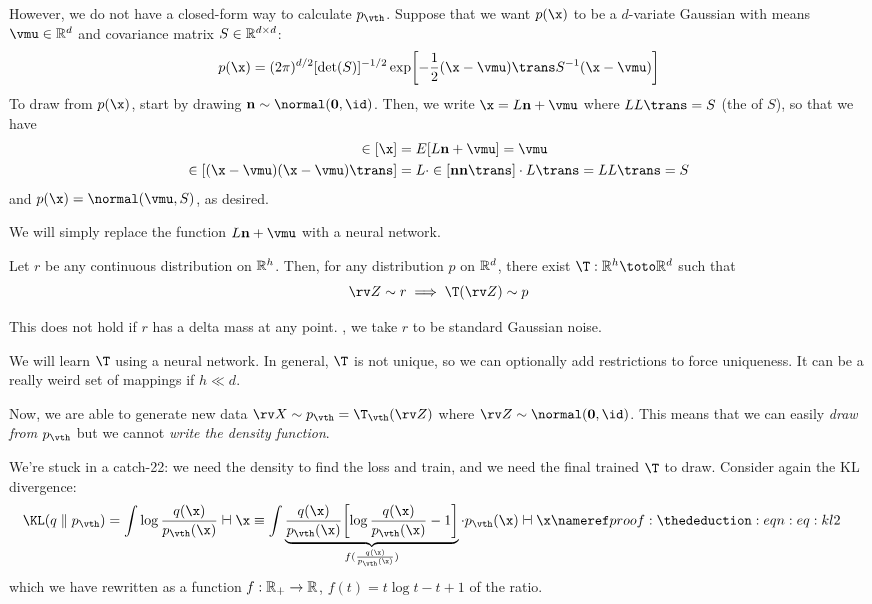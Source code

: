 \documentclass[class=cs480,notes,tikz]{agony}
\begin{document}
However, we do not have a closed-form way to calculate $p_{\vth}$.
Suppose that we want $p(\x)$ to be a $d$-variate Gaussian with means $\vmu \in \R^d$
and covariance matrix $S \in \mathbb{R}^{d \times d}$:
\[ p(\x) = (2\pi)^{d/2}[\det(S)]^{-1/2}\exp[-\frac12(\x-\vmu)\trans S^{-1}(\x-\vmu)] \]
To draw from $p(\x)$, start by drawing $\vb n \sim \normal(\vb 0, \id)$.
Then, we write $\x = L\vb n + \vmu$ where $LL\trans = S$
(the  of $S$),
so that we have
\begin{align*}
  \E[\x]                       & = E[L\vb n + \vmu] = \vmu                                  \\
  \E[(\x-\vmu)(\x-\vmu)\trans] & = L\cdot\E[\vb n \vb n\trans] \cdot L\trans = LL\trans = S
\end{align*}
and $p(\x) = \normal(\vmu,S)$, as desired.

We will simply replace the function $L\vb n + \vmu$ with a neural network.

\begin{theorem}\label{thm:push}
  Let $r$ be any continuous distribution on $\mathbb{R}^h$.
  Then, for any distribution $p$ on $\mathbb{R}^d$, there exist 
  $\T : \R^h \toto \R^d$ such that
  \[ \rv Z \sim r \implies \T(\rv Z) \sim p \]
\end{theorem}

This does not hold if $r$ has a delta mass at any point.
\WLOG, we take $r$ to be standard Gaussian noise.

We will learn $\T$ using a neural network.
In general, $\T$ is not unique, so we can optionally add restrictions to force uniqueness.
It can be a really weird set of mappings if $h \ll d$.

Now, we are able to generate new data $\rv X \sim p_{\vth} = \T_{\vth}(\rv Z)$
where $\rv Z \sim \normal(\vb 0,\id)$.
This means that we can easily \emph{draw from $p_{\vth}$}
but we cannot \emph{write the density function}.

We're stuck in a catch-22: we need the density to find the loss and train,
and we need the final trained $\T$ to draw.
Consider again the KL divergence:
\begin{align*}
  \KL(q \parallel p_{\vth}) & = \int \log\frac{q(\x)}{p_{\vth}(\x)} \dd{\x}
  \equiv \int \underbrace{\frac{q(\x)}{p_{\vth}(\x)}\qty[\log\frac{q(\x)}{p_{\vth}(\x)}-1]}_{f(\frac{q(\x)}{p_{\vth}(\x)})} \cdot p_{\vth}(\x) \dd{\x} \nr{eq:kl2}
\end{align*}
which we have rewritten as a function $f : \mathbb{R}_+ \to \mathbb{R}$, $f(t) = t\log t - t + 1$ of the ratio.
\end{document}

